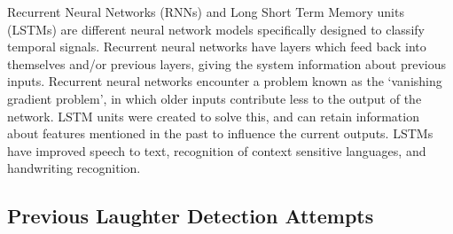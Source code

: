 \documentclass[a4paper,11pt,notitlepage]{article}
\begin{document}
\noindent
Recurrent Neural Networks (RNNs) and Long Short Term Memory units (LSTMs) are different neural network models specifically designed to classify temporal signals. Recurrent neural networks have layers which feed back into themselves and/or previous layers, giving the system information about previous inputs. Recurrent neural networks encounter a problem known as the `vanishing gradient problem', in which older inputs contribute less to the output of the network. LSTM units were created to solve this, and can retain information about features mentioned in the past to influence the current outputs. LSTMs have improved speech to text\cite{graves2013speech}, recognition of context sensitive languages, and handwriting recognition\cite{greff2016lstm}.

\newpage

\subsection{Previous Laughter Detection Attempts}

\end{document}
